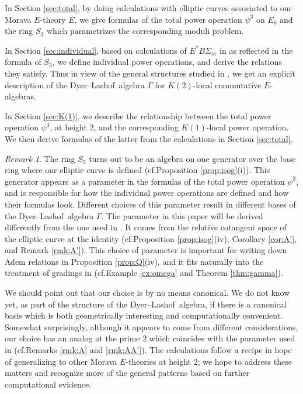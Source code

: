 \documentclass{gtpart}
\theoremstyle{definition}
\theoremstyle{remark}
\newtheorem{rmk}[thm]{Remark}
\newcommand{\cf}{cf.\thinspace}
\newcommand{\DL}{Dyer--Lashof~}
\newcommand{\G}{\Gamma}
\newcommand{\p}{\psi^3}
\newcommand{\isog}[1]{Proposition \ref{prop:isog}\thinspace (#1)}
\begin{document}
In Section \ref{sec:total}, by doing calculations with elliptic curves associated to our Morava $E$-theory $E$, 
we give formulas of the total power operation $\p$ on $E_0$ and the ring $S_3$ which parametrizes the corresponding moduli problem.  

In Section \ref{sec:individual}, based on calculations of $E^* B\Sigma_m$ in \cite{Str98} as reflected in the formula of $S_3$, 
we define individual power operations, and derive the relations they satisfy.  
Thus in view of the general structures studied in \cite{cong}, 
we get an explicit description of the \DL algebra $\G$ for $K(2)$-local commutative $E$-algebras.  

In Section \ref{sec:K(1)}, we describe the relationship between the total power operation $\p$, at height 2, and the corresponding $K(1)$-local power operation.  
We then derive formulas of the latter from the calculations in Section \ref{sec:total}.  

\begin{rmk}
\label{rmk:parameter}
 The ring $S_3$ turns out to be an algebra on one generator over the base ring where our elliptic curve is defined 
 (\cf \isog{i}).  This generator appears as a parameter in the formulas of the total power operation $\p$, 
 and is responsible for how the individual power operations are defined and how their formulas look.  
 Different choices of this parameter result in different bases of the \DL algebra $\G$.  
 The parameter in this paper will be derived differently from the one used in \cite{h2p2}.  
 It comes from the relative cotangent space of the elliptic curve at the identity (\cf \isog{iv}, Corollary \ref{cor:A'}, and Remark \ref{rmk:A'}).  
 This choice of parameter is important for writing down Adem relations in Proposition \ref{prop:Q}\thinspace (iv), 
 and it fits naturally into the treatment of gradings in \cite{cong} (\cf Example \ref{ex:omega} and Theorem \ref{thm:gamma}).  

 We should point out that our choice is by no means canonical.  
 We do not know yet, as part of the structure of the \DL algebra, 
 if there is a canonical basis which is both geometrically interesting and computationally convenient.  
 Somewhat surprisingly, although it appears to come from different considerations, 
 our choice has an analog at the prime 2 which coincides with the parameter used in \cite{h2p2} (\cf Remarks \ref{rmk:A} and \ref{rmk:AA'}).  
 The calculations follow a recipe in hope of generalizing to other Morava $E$-theories at height 2; 
 we hope to address these matters and recognize more of the general patterns based on further computational evidence.  
\end{rmk}
\end{document}
